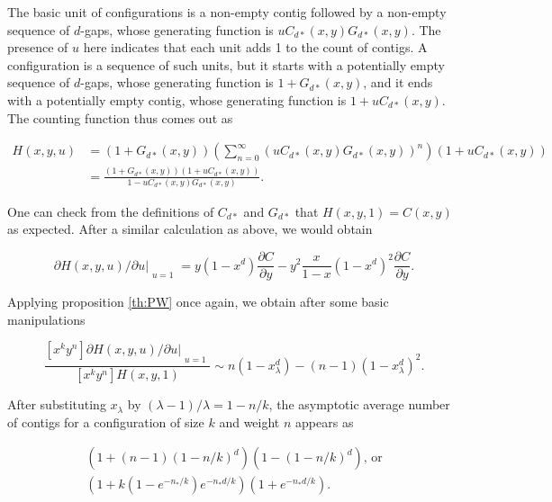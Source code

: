 \documentclass{article}
\begin{document}
The basic unit of configurations is a non-empty contig followed by a
non-empty sequence of $d$-gaps, whose generating function is
$uC_{d*}(x,y)G_{d*}(x,y)$. The presence of $u$ here indicates that each
unit adds 1 to the count of contigs. A configuration is a sequence of such
units, but it starts with a potentially empty sequence of $d$-gaps, whose
generating function is $1+G_{d*}(x,y)$, and it ends with a potentially
empty contig, whose generating function is $1+uC_{d*}(x,y)$. The counting
function thus comes out as

\begin{equation*}
\begin{split}
H(x,y,u) &= \left( 1+G_{d*}(x,y) \right)
\left( \sum_{n=0}^\infty (uC_{d*}(x,y)G_{d*}(x,y))^n \right)
\left( 1+uC_{d*}(x,y) \right) \\
& = \frac{(1+G_{d*}(x,y))(1+uC_{d*}(x,y))}{1-uC_{d*}(x,y)G_{d*}(x,y)}.
\end{split}
\end{equation*}

One can check from the definitions of $C_{d*}$ and $G_{d*}$ that $H(x,y,1)
= C(x,y)$ as expected. After a similar calculation as above, we would
obtain

\begin{equation*}
\partial H(x,y,u)/\partial u|_{\substack{\\u=1}}
= y(1-x^d) \frac{\partial C}{\partial y} - y^2\frac{x}{1-x}(1-x^d)^2
\frac{\partial C}{\partial y}.
\end{equation*}

Applying proposition \ref{th:PW} once again, we obtain after some basic
manipulations

\begin{equation}
\frac{[x^ky^n] \partial H(x,y,u)/\partial u|_{\substack{\\u=1}}}
{[x^ky^n]H(x,y,1)} \sim n(1-x_\lambda^d) - (n-1)(1-x_\lambda^d)^2.
\end{equation}

After substituting $x_\lambda$ by $(\lambda-1)/\lambda = 1-n/k$, the
asymptotic average number of contigs for a configuration of size $k$ and
weight $n$ appears as

\begin{equation}
\label{eq:avcont}
\begin{split}
\left( 1+(n-1)(1-n/k)^d \right) \left(1-(1-n/k)^d\right) \text{, or} \\
\left( 1 + k(1-e^{-n_*/k})e^{-n_*d/k} \right) (1+e^{-n_*d/k}).
\end{split}
\end{equation}
\end{document}
